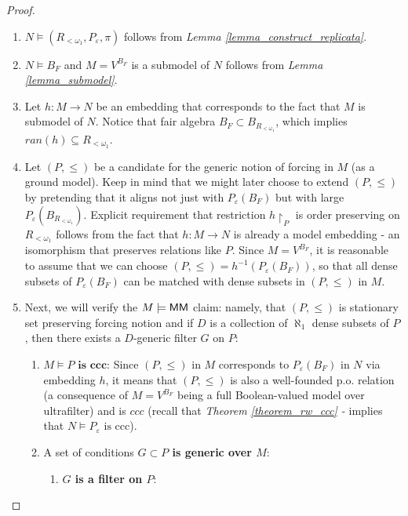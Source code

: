 \begin{proof}
    \begin{enumerate}
        \item $N \models (R_{<\omega_1}, P_\varepsilon, \pi)$ follows from \textit{Lemma \ref{lemma_construct_replicata}}.
        \item $N \models B_F$ and $M = V^{B_F}$ is a submodel of $N$ follows from \textit{Lemma \ref{lemma_submodel}}. \item Let $h: M \to N$ be an embedding that corresponds to the fact that $M$ is submodel of $N$. Notice that fair algebra $B_F \subset B_{R_{<\omega_1}}$, which implies $ran(h) \subseteq R_{<\omega_1}$. 
        \item Let $(P, \leq)$ be a candidate for the generic notion of forcing in $M$ (as a ground model). Keep in mind that we might later choose to extend $(P, \leq)$ by pretending that it aligns not just with $P_\varepsilon(B_F)$ but with large $P_\varepsilon(B_{R_{<\omega_1}})$. Explicit requirement that restriction $h{\upharpoonright}_P$ is order preserving on $R_{<\omega_1}$ follows from the fact that $h: M \to N$ is already a model embedding - an isomorphism that preserves relations like $P$. Since $M = V^{B_F}$, it is reasonable to assume that we can choose $(P, \leq) = h^{-1}(P_\varepsilon(B_F))$, so that all dense subsets of $P_\varepsilon(B_F)$ can be matched with dense subsets in $(P, \leq)$ in $M$. 
        \item Next, we will verify the $M \models {\sf MM}$ claim: namely, that $(P, \leq)$ is stationary set preserving forcing notion and if \(D\) is a collection of \(\aleph_1\) dense subsets of \(P\), then there exists a \(D\)-generic filter $G$ on \(P\):
        \begin{enumerate}
            \item \boldmath $M \models P \textbf{ is ccc}$\unboldmath: Since $(P, \leq)$ in $M$ corresponds to $P_\varepsilon(B_F)$ in $N$ via embedding $h$, it means that $(P, \leq)$ is also a well-founded p.o. relation (a consequence of $M = V^{B_F}$ being a full Boolean-valued model over ultrafilter) and is $ccc$ (recall that \textit{Theorem \ref{theorem_rw_ccc} - } implies that $N \models P_\varepsilon \text{ is ccc}$).
            \item A set of conditions \boldmath\textbf{$G \subset P$ is generic over $M$}\unboldmath: 
            \begin{enumerate}[label=(\roman*)]
                \item \boldmath\textbf{$G$ is a filter on $P$}\unboldmath: 

\end{enumerate}
\end{enumerate}
\end{enumerate}
\end{proof}
